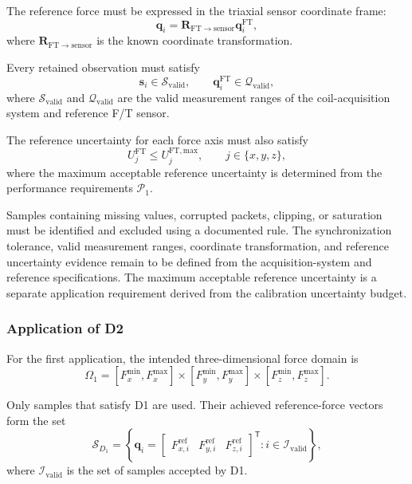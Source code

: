 \documentclass[11pt,a4paper]{article}
\begin{document}
The reference force must be expressed in the triaxial sensor coordinate frame:
\begin{equation}
    \mathbf{q}_i
    =
    \mathbf{R}_{\mathrm{FT}\rightarrow\mathrm{sensor}}
    \mathbf{q}_i^{\mathrm{FT}},
\end{equation}
where $\mathbf{R}_{\mathrm{FT}\rightarrow\mathrm{sensor}}$ is the known
coordinate transformation.

Every retained observation must satisfy
\begin{equation}
    \mathbf{s}_i\in\mathcal{S}_{\mathrm{valid}},
    \qquad
    \mathbf{q}_i^{\mathrm{FT}}\in\mathcal{Q}_{\mathrm{valid}},
\end{equation}
where $\mathcal{S}_{\mathrm{valid}}$ and $\mathcal{Q}_{\mathrm{valid}}$ are the
valid measurement ranges of the coil-acquisition system and reference F/T
sensor.

The reference uncertainty for each force axis must also satisfy
\begin{equation}
    U_j^{\mathrm{FT}}
    \leq
    U_j^{\mathrm{FT,max}},
    \qquad
    j\in\{x,y,z\},
\end{equation}
where the maximum acceptable reference uncertainty is determined from the
performance requirements $\mathcal{P}_1$.

Samples containing missing values, corrupted packets, clipping, or saturation
must be identified and excluded using a documented rule. The synchronization
tolerance, valid measurement ranges, coordinate transformation, and reference
uncertainty evidence remain to be defined from the acquisition-system and
reference specifications. The maximum acceptable reference uncertainty is a
separate application requirement derived from the calibration uncertainty
budget.
\subsubsection{Application of D2}

For the first application, the intended three-dimensional force domain is
\begin{equation}
    \Omega_1
    =
    [F_x^{\min},F_x^{\max}]
    \times
    [F_y^{\min},F_y^{\max}]
    \times
    [F_z^{\min},F_z^{\max}].
\end{equation}

Only samples that satisfy D1 are used. Their achieved reference-force vectors
form the set
\begin{equation}
    \mathcal{S}_{D_1}
    =
    \left\{
        \mathbf{q}_i
        =
        \begin{bmatrix}
            F_{x,i}^{\mathrm{ref}} &
            F_{y,i}^{\mathrm{ref}} &
            F_{z,i}^{\mathrm{ref}}
        \end{bmatrix}^{\mathsf{T}}
        :
        i\in\mathcal{I}_{\mathrm{valid}}
    \right\},
\end{equation}
where $\mathcal{I}_{\mathrm{valid}}$ is the set of samples accepted by D1.
\end{document}
